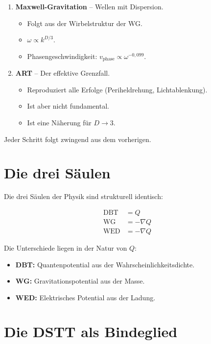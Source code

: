 \begin{enumerate}
\item \textbf{Maxwell-Gravitation} – Wellen mit Dispersion.
      \begin{itemize}
      \item Folgt aus der Wirbelstruktur der WG.
      \item \( \omega \propto k^{D/3} \).
      \item Phasengeschwindigkeit: \( v_{\text{phase}} \propto \omega^{-0,099} \).
      \end{itemize}
      
\item \textbf{ART} – Der effektive Grenzfall.
      \begin{itemize}
      \item Reproduziert alle Erfolge (Periheldrehung, Lichtablenkung).
      \item Ist aber nicht fundamental.
      \item Ist eine Näherung für \( D \to 3 \).
      \end{itemize}
\end{enumerate}

Jeder Schritt folgt zwingend aus dem vorherigen.

\section{Die drei Säulen}

Die drei Säulen der Physik sind strukturell identisch:

\[
\begin{aligned}
\text{DBT} &= Q \\
\text{WG} &= -\nabla Q \\
\text{WED} &= -\nabla Q
\end{aligned}
\]

Die Unterschiede liegen in der Natur von \( Q \):
\begin{itemize}
\item \textbf{DBT:} Quantenpotential aus der Wahrscheinlichkeitsdichte.
\item \textbf{WG:} Gravitationspotential aus der Masse.
\item \textbf{WED:} Elektrisches Potential aus der Ladung.
\end{itemize}

\section{Die DSTT als Bindeglied}


